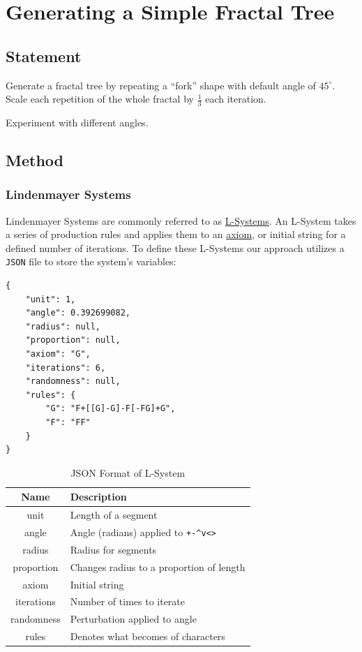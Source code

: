 \section{Generating a Simple Fractal Tree}

\subsection{Statement}

Generate a fractal tree by repeating a ``fork'' shape with default angle of $45^\circ$.
Scale each repetition of the whole fractal by $\frac{1}{3}$ each iteration.

Experiment with different angles.

\subsection{Method}

\subsubsection{Lindenmayer Systems}
Lindenmayer Systems are commonly referred to as 
\href{https://en.wikipedia.org/wiki/L-system}{L-Systems}. An L-System takes a 
series of production rules and applies them to an 
\href{https://en.wikipedia.org/wiki/Axiom}{axiom}, or initial string for a 
defined number of iterations. To define these L-Systems our approach utilizes a 
\texttt{JSON} file to store the system's variables:

\begin{verbatim}
{
    "unit": 1,
    "angle": 0.392699082,
    "radius": null,
    "proportion": null,
    "axiom": "G",
    "iterations": 6,
    "randomness": null,
    "rules": {
        "G": "F+[[G]-G]-F[-FG]+G",
        "F": "FF"
    }
}
\end{verbatim}


\begin{table}
\begin{center}
\begin{tabular}{| c | l |}
    \hline
    \textbf{Name} & \textbf{Description} \\ \hline
    unit & Length of a segment  \\ \hline
    angle & Angle (radians) applied to \verb|+-^v<>|  \\ \hline
    radius & Radius for segments  \\ \hline
    proportion & Changes radius to a proportion of length  \\ \hline
    axiom & Initial string  \\ \hline
    iterations & Number of times to iterate  \\ \hline
    randomness & Perturbation applied to angle  \\ \hline
    rules & Denotes what becomes of characters  \\ \hline
\end{tabular}
\caption{JSON Format of L-System}
\label{table:json_format}
\end{center}
\end{table}

